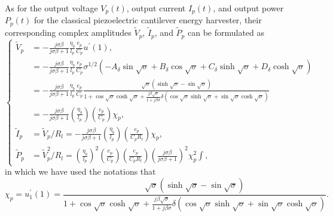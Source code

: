 \documentclass{article}
\begin{document}
As for the output voltage $V_p(t)$, output current $I_p(t)$, and output power $P_p(t)$ for the classical piezoelectric cantilever energy harvester, their corresponding complex amplitudes $\tilde{V}_p$, $\tilde{I}_p$, and $\tilde{P}_p$ can be formulated as
\begin{equation}
    \left\{\begin{aligned}
        \tilde{V}_p &= -\frac{j \sigma \beta}{j \sigma \beta + 1} \frac{\eta_b}{l_p} \frac{e_p}{C_p} u^\prime(1), \\
        &= -\frac{j \sigma \beta}{j \sigma \beta + 1} \frac{\eta_b}{l_p} \frac{e_p}{C_p} \sigma^{1/2} \left( - A_\delta \sin{\sqrt{\sigma}} + B_\delta \cos{\sqrt{\sigma}} + C_\delta \sinh{\sqrt{\sigma}} + D_\delta \cosh{\sqrt{\sigma}} \right) \\
        &= - \frac{j \sigma \beta}{j \sigma \beta + 1} \frac{\eta_b}{l_p} \frac{e_p}{C_p}  \frac{ \sqrt{\sigma} \left( \sinh\sqrt{\sigma} - \sin\sqrt{\sigma} \right) }{ 1 + \cos\sqrt{\sigma } \cosh\sqrt{\sigma } + \frac{j \beta \sqrt{\sigma}}{ 1+ j \beta \sigma } \delta \left( \cos\sqrt{\sigma } \sinh\sqrt{\sigma } + \sin\sqrt{\sigma } \cosh\sqrt{\sigma } \right) }\\
        &= - \frac{j \sigma \beta}{j \sigma \beta + 1} \left(\frac{\eta_b}{l_p}\right) \left(\frac{e_p}{C_p}\right) \chi_p , \\
        \tilde{I}_p &=  \tilde{V}_p / R_l = - \frac{ j \sigma \beta } {j \sigma \beta + 1} \left( \frac{\eta_b}{l_p} \right) \left( \frac{e_p}{C_p R_l} \right) \chi_p , \\
        \tilde{P}_p &=  \tilde{V}_p^2 / R_l = \left(\frac{\eta_b}{l_p}\right)^2 \left(\frac{e_p}{C_p}\right) \left( \frac{e_p}{C_p R_l} \right) \left( \frac{ j \sigma \beta}{ j \sigma \beta + 1 } \right)^2 \chi_p^2∫,
    \end{aligned}\right.
    \label{eq:eq_peh_perfs_compact_form}
\end{equation}
in which we have used the notations that 
\begin{equation}
    \chi_p = u_1^\prime(1) = \frac{ \sqrt{\sigma} \left( \sinh\sqrt{\sigma} - \sin\sqrt{\sigma} \right) }{ 1 + \cos\sqrt{\sigma } \cosh\sqrt{\sigma } + \frac{j \beta \sqrt{\sigma}}{ 1+ j \beta \sigma } \delta \left( \cos\sqrt{\sigma } \sinh\sqrt{\sigma } + \sin\sqrt{\sigma } \cosh\sqrt{\sigma } \right) }.
\end{equation}
\end{document}
